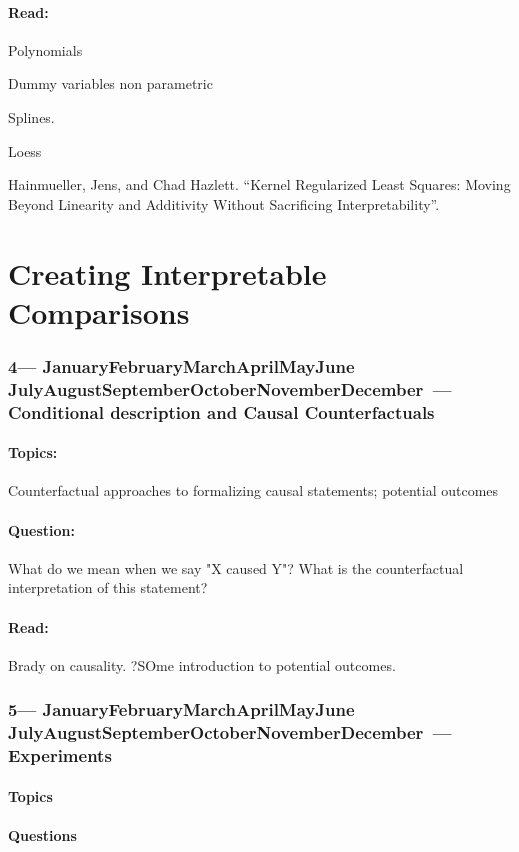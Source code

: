 \documentclass[10pt]{article}
\def\themonth{\ifcase\month\or
	January\or February\or March\or April\or May\or June\or
	July\or August\or September\or October\or November\or December\fi}
\begin{document}
\subsection{Read:}

Polynomials

Dummy variables non parametric

Splines.

Loess

Hainmueller, Jens, and Chad Hazlett. “Kernel Regularized Least Squares: Moving Beyond Linearity and Additivity Without Sacrificing Interpretability”.

\part{Creating Interpretable Comparisons}

\AdvanceDate[7]
\section{4---\themonth~\the\day---Conditional description and Causal Counterfactuals}

\subsection{Topics:} Counterfactual approaches to formalizing causal
statements; potential outcomes
\subsection{Question:} What do we mean when we say "X caused Y"? What is the
counterfactual interpretation of this statement?

\subsection{Read:}

Brady on causality.
?SOme introduction to potential outcomes.


\AdvanceDate[7]
\section{5---\themonth~\the\day---Experiments}

\subsection{Topics}
\subsection{Questions}
\end{document}
